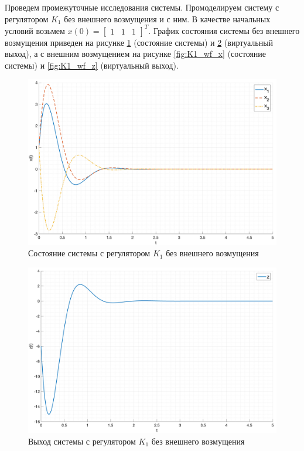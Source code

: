Проведем промежуточные исследования системы. Промоделируем систему с регулятором $K_1$ 
без внешнего возмущения и с ним. 
В качестве начальных условий возьмем $x(0) = \begin{bmatrix}1 & 1 & 1\end{bmatrix}^T$.
График состояния системы без внешнего возмущения приведен на рисунке \ref{fig:K1_free_x} 
(состояние системы) и \ref{fig:K1_free_z} (виртуальный выход),
а с внешним возмущением на рисунке \ref{fig:K1_wf_x} (состояние системы) и \ref{fig:K1_wf_z} (виртуальный выход).
\begin{figure}[ht!]
    \centering
    \includegraphics[width=\textwidth]{media/plots/K1_free_x.png}
    \caption{Состояние системы с регулятором $K_1$ без внешнего возмущения}
    \label{fig:K1_free_x}
\end{figure}
\begin{figure}[ht!]
    \centering
    \includegraphics[width=\textwidth]{media/plots/K1_free_z.png}
    \caption{Выход системы с регулятором $K_1$ без внешнего возмущения}
    \label{fig:K1_free_z}
\end{figure}
